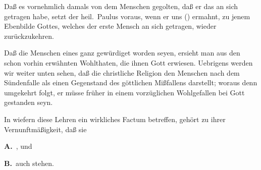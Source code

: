 \begin{aufza}
\item Daß es vornehmlich damals von dem Menschen gegolten, daß er das  an sich getragen habe, setzt der heil.\ Paulus voraus, wenn er uns () ermahnt, zu jenem Ebenbilde Gottes, welches der erste Mensch an sich getragen, wieder zurückzukehren.
\item Daß die Menschen eines ganz  gewürdiget worden seyen, ersieht man aus den schon vorhin erwähnten Wohlthaten, die ihnen Gott erwiesen. Uebrigens werden wir weiter unten sehen, daß die christliche Religion den Menschen nach dem Sündenfalle als einen Gegenstand des göttlichen Mißfallens darstellt; woraus denn umgekehrt folgt, er müsse früher in einem vorzüglichen Wohlgefallen bei Gott gestanden seyn.~
\end{aufza}

In wiefern diese Lehren ein wirkliches Factum betreffen, gehört zu ihrer Vernunftmäßigkeit, daß sie\par
\textbf{A.}~, und\par
\textbf{B.}~auch  stehen.\par

